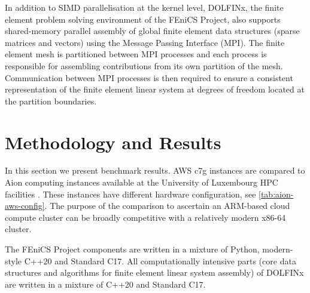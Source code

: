 In addition to SIMD parallelisation at the kernel level, DOLFINx, the finite
element problem solving environment of the FEniCS Project, also supports
shared-memory parallel assembly of global finite element data structures
(sparse matrices and vectors) using the Message Passing Interface (MPI). The
finite element mesh is partitioned between MPI processes and each process is
responsible for assembling contributions from its own partition of the mesh.
Communication between MPI processes is then required to ensure a consistent
representation of the finite element linear system at degrees of freedom
located at the partition boundaries.



\section*{Methodology and Results}
In this section we present benchmark results. AWS c7g instances are compared to
Aion computing instances available at the University of Luxembourg HPC
facilities \citep{VCPKVO_HPCCT22}. These instances have different hardware
configuration, see \autoref{tab:aion-aws-config}. The purpose of the comparison
to ascertain an ARM-based cloud compute cluster can be broadly competitive with
a relatively modern x86-64 cluster.

The FEniCS Project components are written in a mixture of Python, modern-style
C++20 and Standard C17. All computationally intensive parts (core data
structures and algorithms for finite element linear system assembly) of DOLFINx
are written in a mixture of C++20 and Standard C17.


